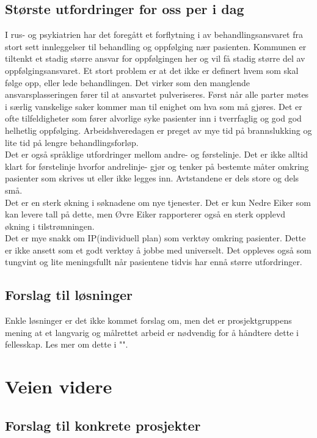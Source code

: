 \documentclass[11pt]{report} %
\begin{document}
                \section{Største utfordringer for oss per i dag} \label{chap:disk_utf}
                  I rus- og psykiatrien har det foregått et forflytning i av behandlingsansvaret fra stort sett innleggelser til behandling og oppfølging nær pasienten. Kommunen er tiltenkt et stadig større ansvar for oppfølgingen her og vil få stadig større del av oppfølgingsansvaret. Et stort problem er at det ikke er definert hvem som skal følge opp, eller lede behandlingen. Det virker som den manglende ansvarsplasseringen fører til at ansvartet pulveriseres. Først når alle parter møtes i særlig vanskelige saker kommer man til enighet om hva som må gjøres. Det er ofte tilfeldigheter som fører alvorlige syke pasienter inn i tverrfaglig og god god helhetlig oppfølging. Arbeidshveredagen er preget av mye tid på brannslukking og lite tid på lengre behandlingsforløp.\\
                  Det er også språklige utfordringer mellom andre- og førstelinje. Det er ikke alltid klart for førstelinje hvorfor andrelinje- gjør og tenker på bestemte måter omkring pasienter som skrives ut eller ikke legges inn. Avtstandene er dels store og dels små.\\
                  Det er en sterk økning i søknadene om nye tjenester. Det er kun Nedre Eiker som kan levere tall på dette, men Øvre Eiker rapporterer også en sterk opplevd økning i tilstrømningen.\\
                  Det er mye snakk om IP(individuell plan) som verktøy omkring pasienter. Dette er ikke ansett som et godt verktøy å jobbe med universelt. Det oppleves også som tungvint og lite meningsfullt når pasientene tidvis har ennå større utfordringer.

                \section{Forslag til løsninger}\label{chap:disk_losn}
                  Enkle løsninger er det ikke kommet forslag om, men det er prosjektgruppens mening at et langvarig og målrettet arbeid er nødvendig for å håndtere dette i fellesskap. Les mer om dette i "".
              \chapter{Veien videre}\label{chap:vvidere}
                \section{Forslag til konkrete prosjekter}\label{chap:vvidere_konkpr}
\end{document}

